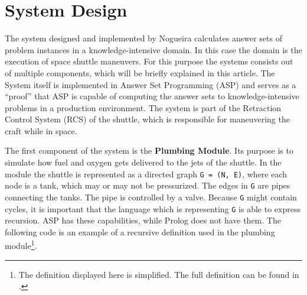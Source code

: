 \documentclass[runningheads]{llncs}
\newcommand{\authorquote}{Nogueira \etal}
\begin{document}
\begin{comment}
\begin{itemize}
    \item medium sized knowledge-intensive system for computing answer sets 
    \item System can do (1) check if a sequence of actions sattisifies a goal (2) give me a list of max k instructions to reach a goal.
    \item Build medium-sized logical program for Retraction Control System (RCS)
    \item To execute a maneuver, you have to find a plan, even if there is malfunction. A system should find an alternative sequence of instructions, if the one that you wanted to do is not possible, because of malfunctions.
    \item system is consists of four different modules: plumbing module, valve control module and planning module. 
    \item VCM can be separated into multiple parts: Basic and extended. 
    \item This article will give a brief overview of the different components and highlight the importance of ASP as their implementation language. 
\end{itemize}
\end{comment}




\section{System Design} \label{sec:system_design}

The system designed and implemented by \authorquote{} calculates answer sets of problem instances in a knowledge-intensive domain. In this case the domain is the execution of space shuttle maneuvers. For this purpose the systems consists out of multiple components, which will be briefly explained in this article. The System itself is implemented in Answer Set Programming (ASP) and serves as a ``proof'' that ASP is capable of computing the answer sets to knowledge-intensive problems in a production environment. The system is part of the Retraction Control System (RCS) of the shuttle, which is responsible for maneuvering the craft while in space. 

The first component of the system is the \textbf{Plumbing Module}. Its purpose is to simulate how fuel and oxygen gets delivered to the jets of the shuttle. In the module the shuttle is represented as a directed graph \verb|G = (N, E)|, where each node is a tank, which may or may not be pressurized. The edges in \verb|G| are pipes connecting the tanks. The pipe is controlled by a valve. Because \verb|G| might contain cycles, it is important that the language which is representing \verb|G| is able to express recursion. ASP has these capabilities, while Prolog does not have them. The following code is an example of a recursive definition used in the plumbing module\footnote{The definition displayed here is simplified. The full definition can be found in \cite{nogueira2001prolog}.}. 
\end{document}
